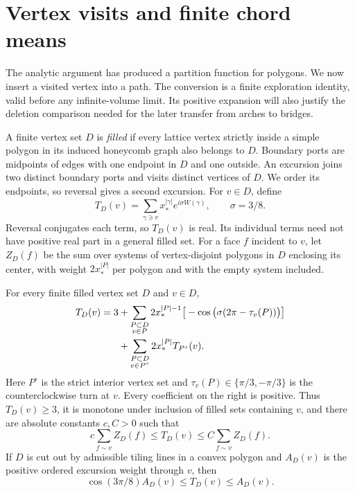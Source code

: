 \section{Vertex visits and finite chord means}\label{c01-c1-the-two-leg-mass}

The analytic argument has produced a partition function for polygons.
We now insert a visited vertex into a path. The conversion is a finite
exploration identity, valid before any infinite-volume limit. Its
positive expansion will also justify the deletion comparison needed
for the later transfer from arches to bridges.

A finite vertex set $D$ is \emph{filled} if every lattice vertex
strictly inside a simple polygon in its induced honeycomb graph also
belongs to $D$. Boundary ports are midpoints of edges with one endpoint
in $D$ and one outside. An excursion joins two distinct boundary ports
and visits distinct vertices of $D$. We order its endpoints, so
reversal gives a second excursion. For $v\in D$, define
\[
 T_D(v)=\sum_{\gamma\ni v}x_*^{|\gamma|}e^{i\sigma W(\gamma)},
 \qquad \sigma=3/8.
\]
Reversal conjugates each term, so $T_D(v)$ is real. Its individual
terms need not have positive real part in a general filled set.
For a face $f$ incident to $v$, let $Z_D(f)$ be the sum over systems
of vertex-disjoint polygons in $D$ enclosing its center, with weight
$2x_*^{|P|}$ per polygon and with the empty system included.

\begin{proposition}\label{prop:pv:visits}
For every finite filled vertex set $D$ and $v\in D$,
\begin{align}
 T_D(v)=3
 &+\sum_{\substack{P\subset D\\v\in P}}
 2x_*^{|P|-1}\big[-\cos\big(\sigma(2\pi-\tau_v(P))\big)\big]
 \label{eq:pv:visit-recursion}\\
 &+\sum_{\substack{P\subset D\\v\in P^\circ}}
 2x_*^{|P|}T_{P^\circ}(v).\notag
\end{align}
Here $P^\circ$ is the strict interior vertex set and
$\tau_v(P)\in\{\pi/3,-\pi/3\}$ is the counterclockwise turn at $v$.
Every coefficient on the right is positive. Thus $T_D(v)\ge3$,
it is monotone under inclusion of filled sets containing $v$, and
there are absolute constants $c,C>0$ such that
\[
 c\sum_{f\sim v}Z_D(f)\le T_D(v)\le C\sum_{f\sim v}Z_D(f).
\]
If $D$ is cut out by admissible tiling lines in a convex polygon and
$A_D(v)$ is the positive ordered excursion weight through $v$, then
\[
 \cos(3\pi/8)A_D(v)\le T_D(v)\le A_D(v).
\]
\end{proposition}

